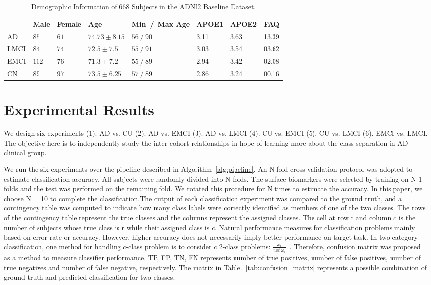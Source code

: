 \documentclass[authoryear,preprint,revi	ew,12pt]{elsarticle}
\begin{document}
\begin{table}[t]
	\begin{center}
		\caption{Demographic Information of $668$ Subjects in the ADNI2 Baseline Dataset.}\label{tab:demographic}
		\begin{tabular}{|P{1.5cm}|P{1cm}P{1cm}P{2.25cm}P{3cm}P{1.25cm}P{1.25cm}P{1.25cm}|}
			\hline
			& Male & Female & Age & Min~/~Max Age & APOE1 & APOE2 & FAQ \\
			\hline\hline
			AD 		& $85$ 	& $61$ & $74.73 \pm 8.15$ 	& $56~/~90$ &	3.11 & 3.63 & 13.39\\
			LMCI 	& $84$ 	& $74$ & $72.5 	\pm 7.5$ 	& $55~/~91$ &	3.03 & 3.54 & 03.62\\
			EMCI 	& $102$ & $76$ & $ 71.3 \pm 7.2 $	& $55~/~89$ &	2.94 & 3.42 & 02.08\\
			CN 		& $89$ 	& $97$ & $ 73.5 \pm 6.25 $ 	& $57~/~89$ &	2.86 & 3.24 & 00.16\\
			\hline
		\end{tabular}
	\end{center}
\end{table}


\section{Experimental Results}
\label{sec:results}
We design six experiments (1). AD vs. CU (2). AD vs. EMCI (3). AD vs. LMCI (4). CU vs. EMCI (5). CU vs. LMCI (6). EMCI vs. LMCI. The objective here is to independently study the inter-cohort relationships in hope of learning more about the class separation in AD clinical group.

We run the six experiments over the pipeline described in Algorithm~\ref{alg:pipeline}. An N-fold cross validation protocol was adopted to estimate classification accuracy. All subjects were randomly divided into N folds. The surface biomarkers were selected by training on N-1 folds and the test was performed on the remaining fold. We rotated this procedure for N times to estimate the accuracy. In this paper, we choose N = 10 to complete the classification.The output of each classification experiment was compared to the ground truth, and a contingency table was computed to indicate how many class labels were correctly identified as members of one of the two classes. The rows of the contingency table represent the true classes and the columns represent the assigned classes. The cell at row r and column $c$ is the number of subjects whose true class is r while their assigned class is $c$. Natural performance measures for classification problems mainly based on error rate or accuracy. However, higher accuracy does not necessarily imply better performance on target task. In two-category classification, one method for handling $c$-class problem is to consider $c$ 2-class problems: $ \frac{\omega_i}{not ~\omega_i} $~\citep{fawcett2004roc}. Therefore, confusion matrix was proposed as a method to measure classifier performance. TP, FP, TN, FN represents number of true positives, number of false positives, number of true negatives and number of false negative, respectively. The matrix in Table.~\ref{tab:confusion_matrix} represents a possible combination of ground truth and predicted classification for two classes.
\end{document}
